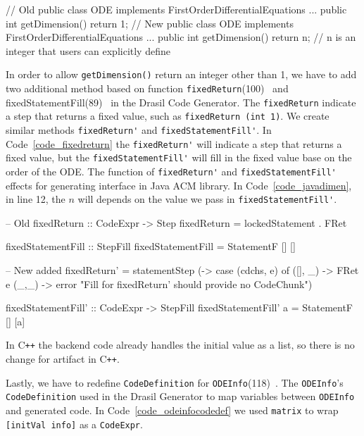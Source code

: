 \begin{listing}
\begin{java1}
// Old 
public class ODE implements FirstOrderDifferentialEquations {
  ...
  public int getDimension() {
    return 1;
  }
}
// New 
public class ODE implements FirstOrderDifferentialEquations {
  ...
  public int getDimension() {
    return n; // n is an integer that users can explicitly define
  }
}
\end{java1}
\label{code_javadimen}
\end{listing}

In order to allow \verb|getDimension()| return an integer other than 1, we have to add two additional method based on function \verb|fixedReturn|(100)~\citep{brooks} and fixedStatementFill(89)~\citep{brooks} in the Drasil Code Generator. The \verb|fixedReturn| indicate a step that returns a fixed value, such as \verb|fixedReturn (int 1)|. We create similar methods \verb|fixedReturn'| and \verb|fixedStatementFill'|. In Code~\ref{code_fixedreturn} the \verb|fixedReturn'| will indicate a step that returns a fixed value, but the \verb|fixedStatementFill'| will fill in the fixed value base on the order of the ODE. The function of \verb|fixedReturn'| and \verb|fixedStatementFill'| effects for generating interface in Java ACM library. In Code~\ref{code_javadimen}, in line 12, the $n$ will depends on the value we pass in \verb|fixedStatementFill'|.

\begin{listing}
\begin{haskell1}
-- Old 
fixedReturn :: CodeExpr -> Step
fixedReturn = lockedStatement . FRet

fixedStatementFill :: StepFill
fixedStatementFill = StatementF [] []

-- New added 
fixedReturn' = statementStep (\cdchs [e] -> case (cdchs, e) of
  ([], _) -> FRet e
  (_,_) -> error "Fill for fixedReturn' should provide no CodeChunk")

fixedStatementFill' :: CodeExpr -> StepFill
fixedStatementFill' a = StatementF [] [a]
\end{haskell1}
\label{code_fixedreturn}
\end{listing}

In C\texttt{++} the backend code already handles the initial value as a list, so there is no change for artifact in C\texttt{++}.

Lastly, we have to redefine \verb|CodeDefinition| for \verb|ODEInfo|(118)~\citep{brooks}. The \verb|ODEInfo|'s \verb|CodeDefinition| used in the Drasil Generator to map variables between \verb|ODEInfo| and generated code. In Code~\ref{code_odeinfocodedef} we used \verb|matrix| to wrap \verb|[initVal info]| as a \verb|CodeExpr|.

